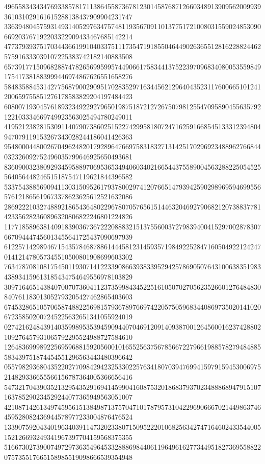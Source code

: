 \begin{DoxyCode}
      496558343434769338578171138645587367812301458768712660348913909562009939361031029161615288138437909904231747
      336394804575931493140529763475748119356709110137751721008031559024853090669203767192203322909433467685142214
      477379393751703443661991040337511173547191855046449026365512816228824462575916333039107225383742182140883508
      657391771509682887478265699599574490661758344137522397096834080053559849175417381883999446974867626551658276
      584835884531427756879002909517028352971634456212964043523117600665101241200659755851276178583829204197484423
      608007193045761893234922927965019875187212726750798125547095890455635792122103334669749923563025494780249011
      419521238281530911407907386025152274299581807247162591668545133312394804947079119153267343028244186041426363
      954800044800267049624820179289647669758318327131425170296923488962766844032326092752496035799646925650493681
      836090032380929345958897069536534940603402166544375589004563288225054525564056448246515187547119621844396582
      533754388569094113031509526179378002974120766514793942590298969594699556576121865619673378623625612521632086
      286922210327488921865436480229678070576561514463204692790682120738837781423356282360896320806822246801224826
      117718589638140918390367367222088832151375560037279839400415297002878307667094447456013455641725437090697939
      612257142989467154357846878861444581231459357198492252847160504922124247014121478057345510500801908699603302
      763478708108175450119307141223390866393833952942578690507643100638351983438934159613185434754649556978103829
      309716465143840700707360411237359984345225161050702705623526601276484830840761183013052793205427462865403603
      674532865105706587488225698157936789766974220575059683440869735020141020672358502007245225632651341055924019
      027421624843914035998953539459094407046912091409387001264560016237428802109276457931065792295524988727584610
      126483699989225695968815920560010165525637567856672279661988578279484885583439751874454551296563443480396642
      055798293680435220277098429423253302257634180703947699415979159453006975214829336655566156787364005366656416
      547321704390352132954352916941459904160875320186837937023488868947915107163785290234529244077365949563051007
      421087142613497459561513849871375704710178795731042296906667021449863746459528082436944578977233004876476524
      133907592043401963403911473202338071509522201068256342747164602433544005152126693249341967397704159568375355
      516673027390074972973635496453328886984406119649616277344951827369558822075735517665158985519098666539354948

\end{DoxyCode}
